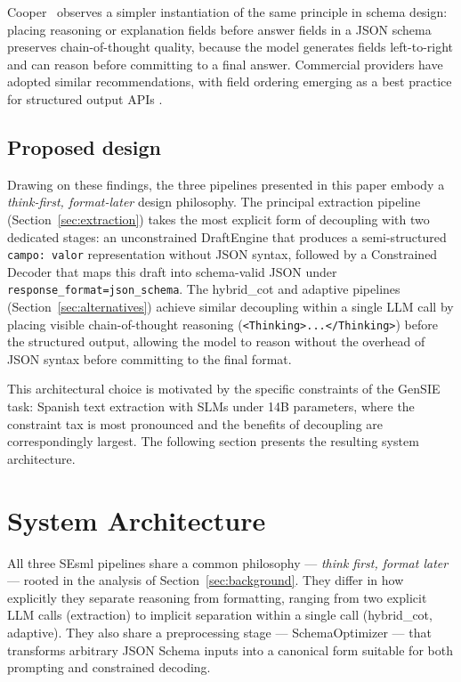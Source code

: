 \documentclass{ceurart}
\begin{document}
Cooper~\cite{Cooper2024} observes a simpler instantiation of the same principle in
schema design: placing reasoning or explanation fields before answer fields in a
JSON schema preserves chain-of-thought quality, because the model generates fields
left-to-right and can reason before committing to a final answer.
Commercial providers have adopted similar recommendations, with field ordering
emerging as a best practice for structured output APIs \cite{Tam2024}.

\subsection{Proposed design}

Drawing on these findings, the three pipelines presented in this paper embody a
\emph{think-first, format-later} design philosophy.
The principal extraction pipeline (Section~\ref{sec:extraction}) takes the most
explicit form of decoupling with two dedicated stages: an unconstrained DraftEngine
that produces a semi-structured \texttt{campo: valor} representation without JSON
syntax, followed by a Constrained Decoder that maps this draft into schema-valid
JSON under \texttt{response\_format=json\_schema}.
The hybrid\_cot and adaptive pipelines (Section~\ref{sec:alternatives}) achieve
similar decoupling within a single LLM call by placing visible chain-of-thought
reasoning (\texttt{<Thinking>...</Thinking>}) before the structured output,
allowing the model to reason without the overhead of JSON syntax before committing
to the final format.

This architectural choice is motivated by the specific constraints of the GenSIE task:
Spanish text extraction with SLMs under 14B parameters, where the constraint tax is
most pronounced and the benefits of decoupling are correspondingly largest.
The following section presents the resulting system architecture.

\section{System Architecture}
\label{sec:architecture}

All three SEsml pipelines share a common philosophy --- \emph{think first, format
later} --- rooted in the analysis of Section~\ref{sec:background}.
They differ in how explicitly they separate reasoning from formatting, ranging from
two explicit LLM calls (extraction) to implicit separation within a single call
(hybrid\_cot, adaptive).
They also share a preprocessing stage --- SchemaOptimizer --- that transforms arbitrary
JSON Schema inputs into a canonical form suitable for both prompting and constrained
decoding.
\end{document}
